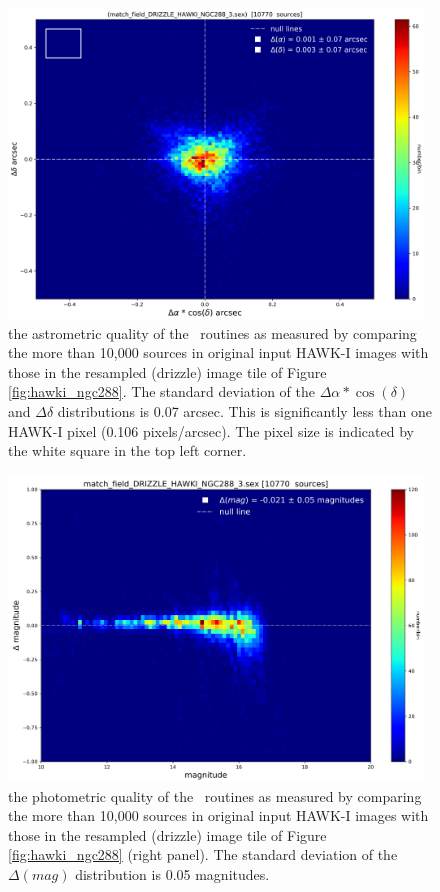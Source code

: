 \begin{figure}[H]
\centering
\includegraphics[width=11cm]{figures/match_field_DRIZZLE_HAWKI_NGC288_3_RA_DEC_scatter_plot.png}
\caption[]
	{\footnotesize  the astrometric quality of the \hdrlresample\ routines as measured by comparing the more than 10,000 sources in original input HAWK-I images
	with those in the resampled (drizzle) image tile of Figure \ref{fig:hawki_ngc288}.
	The standard deviation of the $\Delta\alpha*\cos(\delta)$ and $\Delta\delta$ distributions is 0.07 arcsec. This is significantly less than one HAWK-I
	pixel (0.106 pixels/arcsec).  The pixel size is indicated by the white square in the top left corner.
	}
	\label{fig:radec_NGC288}
\end{figure}


\begin{figure}[H]
\centering
\includegraphics[width=11cm]{figures/match_field_DRIZZLE_HAWKI_NGC288_3_mag_scatter_plot.png}
\caption[]
	{\footnotesize  the photometric quality of the \hdrlresample\ routines as measured by comparing the more than 10,000 sources in original input HAWK-I images
	with those in the resampled (drizzle) image tile of Figure \ref{fig:hawki_ngc288} (right panel).
	The standard deviation of the $\Delta(mag)$  distribution is 0.05 magnitudes. 	
	}
	\label{fig:mag_NGC288}
\end{figure}

